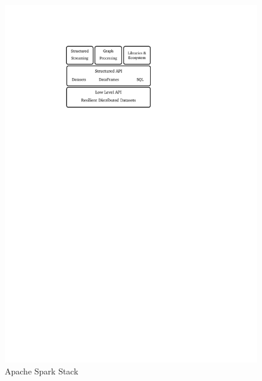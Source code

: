 \begin{figure}[h]
    \centering
    \includegraphics[clip,trim=5cm 21.1cm 8.7cm 3.4cm]{spark-eco.pdf}
    \caption{Apache Spark Stack}
    \label{fig:spark-eco}
\end{figure}

